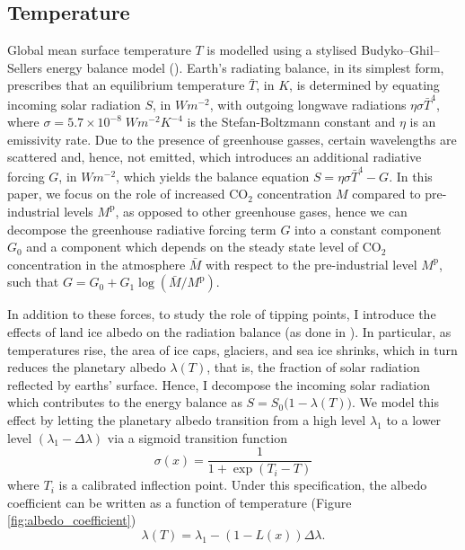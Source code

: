 \documentclass[../../main.tex]{subfiles}
\begin{document}
\subsection{Temperature}

Global mean surface temperature $T$ is modelled using a stylised Budyko–Ghil–Sellers energy balance model (\cite{hogg_glacial_2008, ashwin_extreme_2020}). Earth's radiating balance, in its simplest form, prescribes that an equilibrium temperature $\bar{T}$, in $\unit{K}$, is determined by equating incoming solar radiation $S$, in $\unit{W}\unit{m}^{-2}$, with outgoing longwave radiations $\eta \sigma \bar{T}^4$, where $\sigma = 5.7 \times 10^{-8} \; \unit{W} \unit{m}^{-2} \unit{K}^{-4}$ is the Stefan-Boltzmann constant and $\eta$ is an emissivity rate. Due to the presence of greenhouse gasses, certain wavelengths are scattered and, hence, not emitted, which introduces an additional radiative forcing $G$, in $\unit{W}\unit{m}^{-2}$, which yields the balance equation $S = \eta \sigma \bar{T}^4 - G$. In this paper, we focus on the role of increased CO$_2$ concentration $M$ compared to pre-industrial levels $M^{\mathrm{p}}$, as opposed to other greenhouse gases, hence we can decompose the greenhouse radiative forcing term $G$ into a constant component $G_0$ and a component which depends on the steady state level of CO$_2$ concentration in the atmosphere $\bar{M}$ with respect to the pre-industrial level $M^{\mathrm{p}}$, such that $G = G_0 + G_1 \log(\bar{M} / M^{\mathrm{p}})$.

In addition to these forces, to study the role of tipping points, I introduce the effects of land ice albedo on the radiation balance (as done in \cite{ghil_topics_2011,dijkstra_sensitivity_2015}). In particular, as temperatures rise, the area of ice caps, glaciers, and sea ice shrinks, which in turn reduces the planetary albedo $\lambda(T)$, that is, the fraction of solar radiation reflected by earths' surface. Hence, I decompose the incoming solar radiation which contributes to the energy balance as $S = S_0 \big(1 - \lambda(T)\big)$. We model this effect by letting the planetary albedo transition from a high level $\lambda_1$ to a lower level $(\lambda_1 - \Delta \lambda)$ via a sigmoid transition function \begin{equation}
    \sigma(x) = \frac{1}{1 + \exp(T_i - T)}
\end{equation} where $T_i$ is a calibrated inflection point. Under this specification, the albedo coefficient can be written as a function of temperature (Figure \ref{fig:albedo_coefficient}) \begin{equation} \label{eq:assumption:albedo}
    \lambda(T) = \lambda_1 - (1 - L(x)) \Delta \lambda.
\end{equation} 
\end{document}
